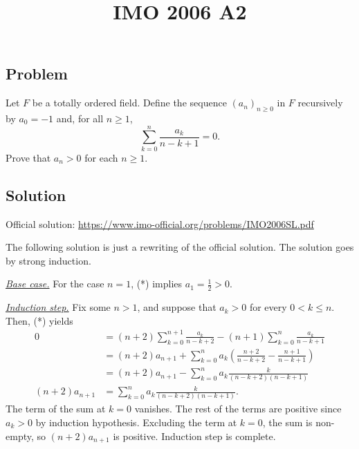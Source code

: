 \documentclass{article}
\title{IMO 2006 A2}
\date{}
\begin{document}
\maketitle



\subsection*{Problem}

Let $F$ be a totally ordered field.
Define the sequence $(a_n)_{n \geq 0}$ in $F$ recursively by $a_0 = -1$ and, for all $n \geq 1$,
\[ \sum_{k = 0}^n \frac{a_k}{n - k + 1} = 0. \tag{*} \]
Prove that $a_n > 0$ for each $n \geq 1$.



\subsection*{Solution}

Official solution: \url{https://www.imo-official.org/problems/IMO2006SL.pdf}

The following solution is just a rewriting of the official solution.
The solution goes by strong induction.

\textit{\underline{Base case.}}
For the case $n = 1$, (*) implies $a_1 = \frac{1}{2} > 0$.

\textit{\underline{Induction step.}}
Fix some $n > 1$, and suppose that $a_k > 0$ for every $0 < k \leq n$.
Then, (*) yields
\begin{align*}
0
    &= (n + 2) \sum_{k = 0}^{n + 1} \frac{a_k}{n - k + 2} - (n + 1) \sum_{k = 0}^n \frac{a_k}{n - k + 1} \\
    &= (n + 2) a_{n + 1} + \sum_{k = 0}^n a_k \left(\frac{n + 2}{n - k + 2} - \frac{n + 1}{n - k + 1}\right) \\
    &= (n + 2) a_{n + 1} - \sum_{k = 0}^n a_k \frac{k}{(n - k + 2)(n - k + 1)} \\
(n + 2) a_{n + 1}
    &= \sum_{k = 0}^n a_k \frac{k}{(n - k + 2)(n - k + 1)}.
\end{align*}
The term of the sum at $k = 0$ vanishes.
The rest of the terms are positive since $a_k > 0$ by induction hypothesis.
Excluding the term at $k = 0$, the sum is non-empty, so $(n + 2) a_{n + 1}$ is positive.
Induction step is complete.
\end{document}
